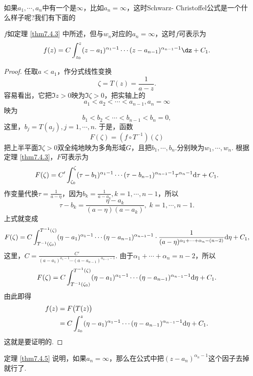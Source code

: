 如果$a_1,\cdots,a_n$中有一个是$\infty$，比如$a_n=\infty$，这时Schwarz-
Christoffel公式是一个什么样子呢?我们有下面的
\begin{theorem}\label{thm7.4.5}
$f$如定理 \ref{thm7.4.3} 中所述，但与$w_n$对应的$a_n=\infty$，这时$f$可表示为
\begin{equation}\label{eq7.4.8}
f(z)=C\int_{z_0}^z(z-a_1)^{\alpha_1-1}\cdots(z-a_{n-1})^{\alpha_{n-1}-1}\dz+C_1.
\end{equation}
\end{theorem}
\begin{proof}
任取$a<a_1$，作分式线性变换
\[\zeta=T(z)=\frac1{a-z}.\]
容易看出，它把$\Im z>0$映为$\Im\zeta>0$，把实轴上的
\[a_1<a_2<\cdots<a_{n-1},a_n=\infty\]
映为
\[b_1<b_2<\cdots<b_{n-1}<b_n=0,\]
这里，$b_j=T(a_j),j=1,\cdots,n$. 于是，函数
\[F(\zeta)=(f\circ T^{-1})(\zeta)\]
把上半平面$\Im\zeta>0$双全纯地映为多角形域$G$，且把$b_1,\cdots,b_n$.分别映为$w_1,\cdots,w_n$. 根据定理 \ref{thm7.4.3}，$F$可表示为
\[F(\zeta)=C'\int_{\zeta_0}^\zeta(\tau-b_1)^{\alpha_1-1}\cdots
(\tau-b_{n-1})^{\alpha_{n-1}-1}\tau^{\alpha_n-1}\textrm d\tau+C_1.\]
作变量代换$\tau=\frac1{a-\eta}$，因为$b_k=\frac1{a-a_k},k=1,\cdots,n-1$，所以
\[\tau-b_k=\frac{\eta-a_k}{(a-\eta)(a-a_k)},\;k=1,\cdots,n-1.\]
上式就变成
\[
F(\zeta)=C\int_{T^{-1}(\zeta_0)}^{T^{-1}(\zeta)}(\eta-a_1)^{\alpha_1-1}\cdots(\eta-a_{n-1})
^{\alpha_{n-1}-1}\cdot\frac1{(a-\eta)^{\alpha_1+\cdots+\alpha_n-(n-2)}}\textrm d\eta+C_1,
\]
这里，$C=\frac{C'}{(a-a_1)^{a_1-1}\cdots(a-a_{n-1})^{\alpha_{n-1}-1}}$. 由于$\alpha_1+\cdots+\alpha_n=n-2$，所以
\[F(\zeta)=C\int_{T^{-1}(\zeta_0)}^{T^{-1}(\zeta)}(\eta-a_1)^{\alpha_1-1}\cdots(\eta-a_{n-1})
^{\alpha_{n-1}-1}\textrm d\eta+C_1.\]
由此即得
\begin{align*}
f(z)&=F\big(T(z)\big)\\
&=C\int_{z_0}^z(\eta-a_1)^{\alpha_1-1}\cdots(\eta-a_{n-1})^{\alpha_{n-1}-1}\textrm d\eta+C_1.
\end{align*}
这就是要证明的.
\end{proof}

定理 \ref{thm7.4.5} 说明，如果$a_n=\infty$，那么在公式中把$(z-a_n)^{\alpha_n-1}$这个因子去掉就行了.

